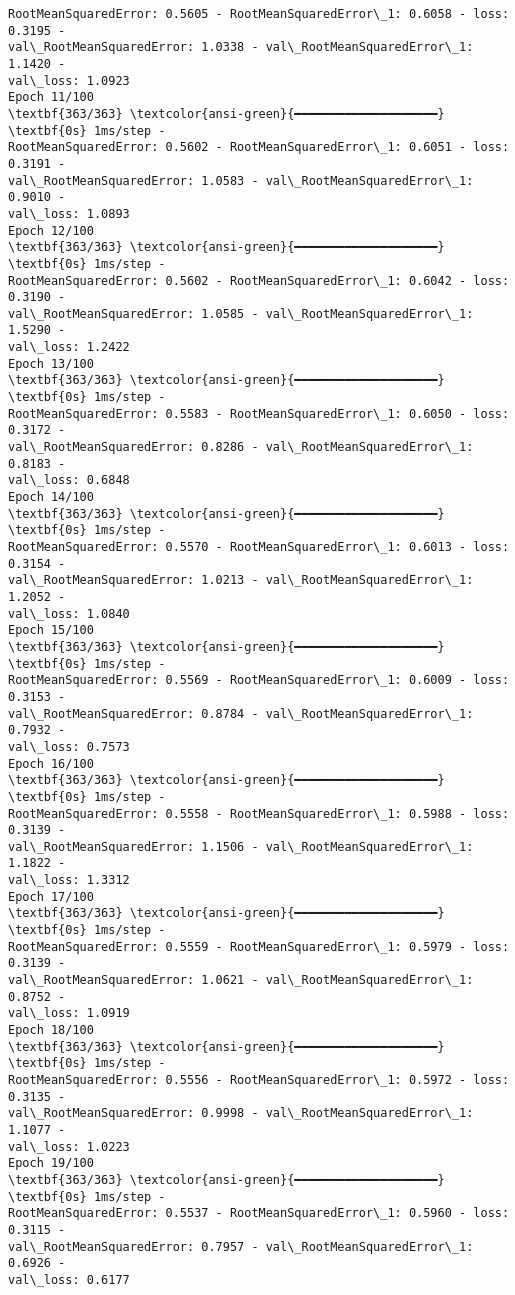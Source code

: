 \documentclass[12pt letter]{report}
\begin{document}
\begin{Verbatim}[commandchars=\\\{\}]
RootMeanSquaredError: 0.5605 - RootMeanSquaredError\_1: 0.6058 - loss: 0.3195 -
val\_RootMeanSquaredError: 1.0338 - val\_RootMeanSquaredError\_1: 1.1420 -
val\_loss: 1.0923
Epoch 11/100
\textbf{363/363} \textcolor{ansi-green}{━━━━━━━━━━━━━━━━━━━━} \textbf{0s} 1ms/step -
RootMeanSquaredError: 0.5602 - RootMeanSquaredError\_1: 0.6051 - loss: 0.3191 -
val\_RootMeanSquaredError: 1.0583 - val\_RootMeanSquaredError\_1: 0.9010 -
val\_loss: 1.0893
Epoch 12/100
\textbf{363/363} \textcolor{ansi-green}{━━━━━━━━━━━━━━━━━━━━} \textbf{0s} 1ms/step -
RootMeanSquaredError: 0.5602 - RootMeanSquaredError\_1: 0.6042 - loss: 0.3190 -
val\_RootMeanSquaredError: 1.0585 - val\_RootMeanSquaredError\_1: 1.5290 -
val\_loss: 1.2422
Epoch 13/100
\textbf{363/363} \textcolor{ansi-green}{━━━━━━━━━━━━━━━━━━━━} \textbf{0s} 1ms/step -
RootMeanSquaredError: 0.5583 - RootMeanSquaredError\_1: 0.6050 - loss: 0.3172 -
val\_RootMeanSquaredError: 0.8286 - val\_RootMeanSquaredError\_1: 0.8183 -
val\_loss: 0.6848
Epoch 14/100
\textbf{363/363} \textcolor{ansi-green}{━━━━━━━━━━━━━━━━━━━━} \textbf{0s} 1ms/step -
RootMeanSquaredError: 0.5570 - RootMeanSquaredError\_1: 0.6013 - loss: 0.3154 -
val\_RootMeanSquaredError: 1.0213 - val\_RootMeanSquaredError\_1: 1.2052 -
val\_loss: 1.0840
Epoch 15/100
\textbf{363/363} \textcolor{ansi-green}{━━━━━━━━━━━━━━━━━━━━} \textbf{0s} 1ms/step -
RootMeanSquaredError: 0.5569 - RootMeanSquaredError\_1: 0.6009 - loss: 0.3153 -
val\_RootMeanSquaredError: 0.8784 - val\_RootMeanSquaredError\_1: 0.7932 -
val\_loss: 0.7573
Epoch 16/100
\textbf{363/363} \textcolor{ansi-green}{━━━━━━━━━━━━━━━━━━━━} \textbf{0s} 1ms/step -
RootMeanSquaredError: 0.5558 - RootMeanSquaredError\_1: 0.5988 - loss: 0.3139 -
val\_RootMeanSquaredError: 1.1506 - val\_RootMeanSquaredError\_1: 1.1822 -
val\_loss: 1.3312
Epoch 17/100
\textbf{363/363} \textcolor{ansi-green}{━━━━━━━━━━━━━━━━━━━━} \textbf{0s} 1ms/step -
RootMeanSquaredError: 0.5559 - RootMeanSquaredError\_1: 0.5979 - loss: 0.3139 -
val\_RootMeanSquaredError: 1.0621 - val\_RootMeanSquaredError\_1: 0.8752 -
val\_loss: 1.0919
Epoch 18/100
\textbf{363/363} \textcolor{ansi-green}{━━━━━━━━━━━━━━━━━━━━} \textbf{0s} 1ms/step -
RootMeanSquaredError: 0.5556 - RootMeanSquaredError\_1: 0.5972 - loss: 0.3135 -
val\_RootMeanSquaredError: 0.9998 - val\_RootMeanSquaredError\_1: 1.1077 -
val\_loss: 1.0223
Epoch 19/100
\textbf{363/363} \textcolor{ansi-green}{━━━━━━━━━━━━━━━━━━━━} \textbf{0s} 1ms/step -
RootMeanSquaredError: 0.5537 - RootMeanSquaredError\_1: 0.5960 - loss: 0.3115 -
val\_RootMeanSquaredError: 0.7957 - val\_RootMeanSquaredError\_1: 0.6926 -
val\_loss: 0.6177

\end{Verbatim}
\end{document}
